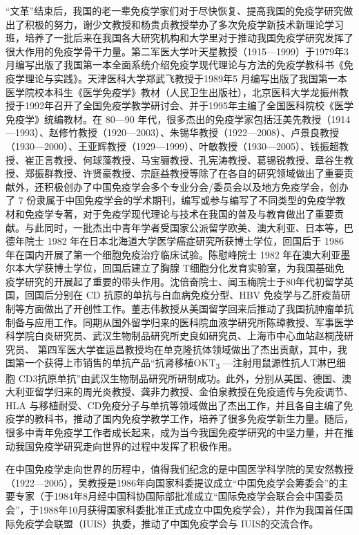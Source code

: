 “文革”结束后，我国的老一辈免疫学家们对于尽快恢复、提高我国的免疫学研究做出了积极的努力，谢少文教授和杨贵贞教授举办了多次免疫学新技术新理论学习班，培养了一批后来在我国各大研究机构和大学里对于推动我国免疫学研究发挥了很大作用的免疫学骨干力量。第二军医大学叶天星教授（1915---1999）于1979年3月编写出版了我国第一本全面系统介绍免疫学现代理论与方法的免疫学教科书《免疫学理论与实践》。天津医科大学郑武飞教授于1989年5
月编写出版了我国第一本医学院校本科生《医学免疫学》教材（人民卫生出版社），北京医科大学龙振州教授于1992年召开了全国免疫学教学研讨会、并于1995年主编了全国医科院校《医学免疫学》统编教材。在
80---90
年代，很多杰出的免疫学家包括汪美先教授（1914---1993）、赵修竹教授（1920---2003）、朱锡华教授（1922---2008）、卢景良教授（1930---2000）、王亚辉教授（1929---1999）、叶敏教授（1930---2005）、钱振超教授、崔正言教授、何球藻教授、马宝骊教授、孔宪涛教授、葛锡锐教授、章谷生教授、郑振群教授、许贤豪教授、宗庭益教授等除了在各自的研究领域做出了重要贡献外，还积极创办了中国免疫学会多个专业分会/委员会以及地方免疫学会，创办了
7
份隶属于中国免疫学会的学术期刊，编写或参与编写了不同类型的免疫学教材和免疫学专著，对于免疫学现代理论与技术在我国的普及与教育做出了重要贡献。与此同时，一批杰出中青年学者受国家公派留学欧美、澳大利亚、日本等，巴德年院士
1982 年在日本北海道大学医学癌症研究所获博士学位，回国后于 1986
年在国内开展了第一个细胞免疫治疗临床试验。陈慰峰院士 1982
年在澳大利亚墨尔本大学获博士学位，回国后建立了胸腺
T细胞分化发育实验室，为我国基础免疫学研究的开展起了重要的带头作用。沈倍奋院士、闻玉梅院士于80年代初留学英国，回国后分别在
CD 抗原的单抗与白血病免疫分型、HBV
免疫学与乙肝疫苗研制等方面做出了开创性工作。董志伟教授从美国留学回来后推动了我国抗肿瘤单抗制备与应用工作。同期从国外留学归来的医科院血液学研究所陈璋教授、军事医学科学院白炎研究员、武汉生物制品研究所史良如研究员、上海市中心血站赵桐茂研究员、
第四军医大学崔运昌教授均在单克隆抗体领域做出了杰出贡献，其中，我国第一个获得上市销售的单抗产品“抗肾移植OKT\textsubscript{3}
---注射用鼠源性抗人T淋巴细胞
CD3抗原单抗”由武汉生物制品研究所研制成功。此外，分别从美国、德国、澳大利亚留学归来的周光炎教授、龚非力教授、金伯泉教授在免疫遗传与免疫调节、HLA
与移植耐受、CD免疫分子与单抗等领域做出了杰出工作，并且各自主编了免疫学的教科书，推动了国内免疫学教学工作，培养了很多免疫学新生力量。随后，很多中青年免疫学工作者成长起来，成为当今我国免疫学研究的中坚力量，并在推动我国免疫学研究走向世界的过程中发挥了积极作用。

在中国免疫学走向世界的历程中，值得我们纪念的是中国医学科学院的吴安然教授（1922---2005），吴教授是1986年向国家科委提议成立“中国免疫学会筹委会”的主要专家（于1984年8月经中国科协国际部批准成立“国际免疫学会联合会中国委员会”，于1988年10月获得国家科委批准正式成立中国免疫学会），并作为我国首任国际免疫学会联盟（IUIS）执委，推动了中国免疫学会与
IUIS的交流合作。

